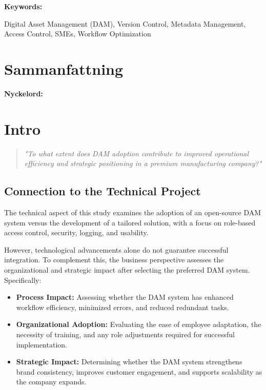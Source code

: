 \documentclass[a4paper,12pt,twocolumn]{article}
\begin{document}
\vspace{0.3cm} 
\textbf{Keywords:} 
    
Digital Asset Management (DAM), Version Control, Metadata Management, Access Control, SMEs, Workflow Optimization


\section{Sammanfattning}

\vspace{0.3cm} 
\textbf{Nyckelord:} 
\newpage

\newpage
\onecolumn
\tableofcontents
\newpage




\twocolumn
{}

\RaggedRight   %
\sloppy        %




\section{Intro}

\begin{quote}
    \textit{"To what extent does DAM adoption contribute to improved operational efficiency and strategic positioning in a premium manufacturing company?"}
\end{quote}

\subsection{Connection to the Technical Project}
The technical aspect of this study examines the adoption of an open-source DAM system versus 
the development of a tailored solution, with a focus on role-based access control, security, 
logging, and usability. 

\vspace{0.3cm} 
However, technological advancements alone do not guarantee successful integration. To complement this,
the business perspective assesses the organizational and strategic impact after selecting the preferred DAM system. Specifically:
\begin{itemize}
    \item \textbf{Process Impact:} Assessing whether the DAM system has enhanced workflow efficiency, minimized errors, and reduced redundant tasks.
    \item \textbf{Organizational Adoption:} Evaluating the ease of employee adaptation, the necessity of training, and any role adjustments required for successful implementation.
    \item \textbf{Strategic Impact:} Determining whether the DAM system strengthens brand consistency, improves customer engagement, and supports scalability as the company expands.
\end{itemize}
\end{document}
